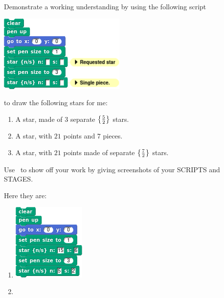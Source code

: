 \documentclass[noauthor,nooutcomes,hints,handout]{ximera}
\begin{document}
\begin{question}
  Demonstrate a working understanding by using the following script
  \begin{center}
    \includegraphics{starsSubBLANKScript.png}
  \end{center}
  to draw the following stars for me:
  \begin{enumerate}
  \item A star, made of $3$ separate $\left\{\frac{5}{2}\right\}$ stars.
   \item A star, with $21$ points and $7$ pieces. 
   \item A star, with $21$ points made of separate $\left\{\frac{7}{2}\right\}$
     stars.
  \end{enumerate}
  Use \snap\ to show off your work by giving screenshots of your
  SCRIPTS and STAGES.
  \begin{freeResponse}
    Here they are:
    \begin{enumerate}
    \item
      \begin{center}
        \includegraphics[width=.3\textwidth]{starsSub15-5-2Script.png}   \qquad {}
      \end{center}
    \item

\end{enumerate}
\end{freeResponse}
\end{question}
\end{document}
